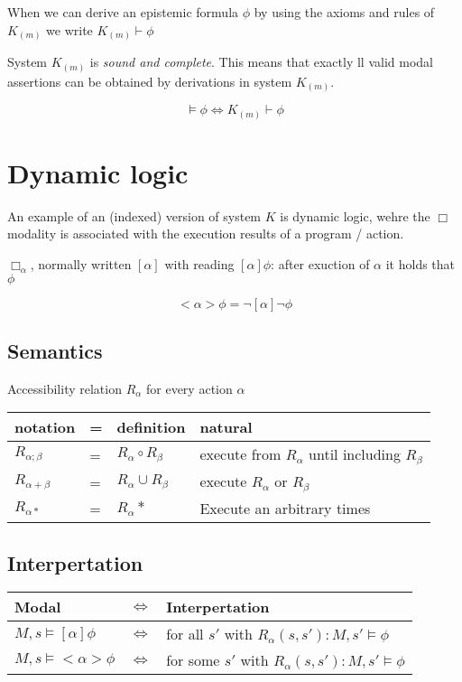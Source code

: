 \documentclass{article}
\begin{document}
When we can derive an epistemic formula $\phi$ by using the axioms
and rules of $K_{(m)}$ we write $K_{(m)} \vdash \phi$

System $K_{(m)}$ is \emph{sound and complete}. This means
that exactly ll valid modal assertions can be obtained by derivations in
system $K_{(m)}$.

\[\vDash \phi \Leftrightarrow K_{(m)} \vdash \phi\]


\section{Dynamic logic}
An example of an (indexed) version of system $K$ is dynamic logic,
wehre the $\Box$ modality is associated with the execution results of
a program / action.

$\Box_\alpha$, normally written $[\alpha]$ 
with reading $[\alpha]\phi$: after exuction of $\alpha$ it holds that $\phi$

\[<\alpha>\phi = \neg [\alpha] \neg \phi \]

\subsection{Semantics}
Accessibility relation $R_\alpha$ for every action $\alpha$

\begin{tabular}{llll}
	notation & = & definition & natural \\ \toprule
	$R_{\alpha;\beta}$ & = & $R_\alpha \circ R_\beta$ &
	execute from $R_\alpha$ until including $R_\beta$\\
	$R_{\alpha+\beta}$ & = & $R_\alpha \cup R_\beta$ &
	execute $R_\alpha$ or $R_\beta$\\
	$R_{\alpha*}$ & = & $R_\alpha*$ &
	Execute an arbitrary times \\ \bottomrule
\end{tabular}

\subsection{Interpertation}
\begin{tabular}{lll}
	Modal & $\Leftrightarrow$ & Interpertation \\ \toprule
	$M,s \vDash [\alpha]\phi$ & $\Leftrightarrow$ &
	for all $s'$ with $R_\alpha(s,s'): M,s' \vDash \phi$ \\
	$M,s \vDash <\alpha>\phi$ & $\Leftrightarrow$ &
	for some $s'$ with $R_\alpha(s,s'): M,s' \vDash \phi$ \\\bottomrule
\end{tabular}
\end{document}

